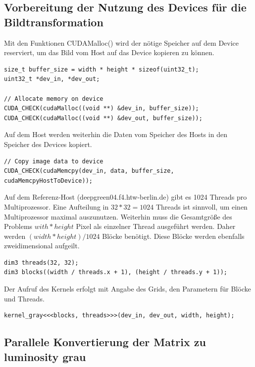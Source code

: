 \documentclass{llncs}
\begin{document}
\subsection{Vorbereitung der Nutzung des Devices für die Bildtransformation}
%

Mit den Funktionen CUDAMalloc() wird der nötige Speicher auf dem Device reserviert, um das Bild vom Host auf das Device kopieren zu können.

\begin{lstlisting}
size_t buffer_size = width * height * sizeof(uint32_t);
uint32_t *dev_in, *dev_out;

// Allocate memory on device
CUDA_CHECK(cudaMalloc((void **) &dev_in, buffer_size));
CUDA_CHECK(cudaMalloc((void **) &dev_out, buffer_size));
\end{lstlisting}

Auf dem Host werden weiterhin die Daten vom Speicher des Hosts in den Speicher des Devices kopiert.\\

\begin{lstlisting}[]
// Copy image data to device
CUDA_CHECK(cudaMemcpy(dev_in, data, buffer_size, cudaMemcpyHostToDevice));
\end{lstlisting}

Auf dem Referenz-Host (deepgreen04.f4.htw-berlin.de) gibt es 1024 Threads pro Multiprozessor. Eine Aufteilung in $32 * 32 = 1024$ Threads ist sinnvoll, um einen Multiprozessor maximal auszunutzen. Weiterhin muss die Gesamtgröße des Problems $with * height$ Pixel als einzelner Thread ausgeführt werden. Daher werden $(width * height) / 1024$ Blöcke benötigt. Diese Blöcke werden ebenfalls zweidimensional aufgeilt.

\begin{lstlisting}
dim3 threads(32, 32);
dim3 blocks((width / threads.x + 1), (height / threads.y + 1));
\end{lstlisting}

Der Aufruf des Kernels erfolgt mit Angabe des Grids, den Parametern für Blöcke und Threads.

\begin{lstlisting}
kernel_gray<<<blocks, threads>>>(dev_in, dev_out, width, height);
\end{lstlisting}

\newpage
%
\subsection{Parallele Konvertierung der Matrix zu luminosity grau}
%
\end{document}
